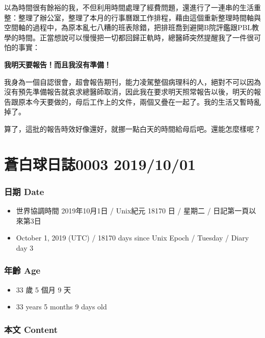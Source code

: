 \documentclass[a5paper, 12pt
]{book}
\providecommand{\tightlist}{%
  \setlength{\itemsep}{0pt}\setlength{\parskip}{0pt}}
\begin{document}
以為時間很有餘裕的我，不但利用時間處理了經費問題，還進行了一連串的生活重整：整理了辦公室，整理了本月的行事曆跟工作排程，藉由這個重新整理時間軸與空間軸的過程中，為原本亂七八糟的班表除錯，把排班喬到避開B院評鑑跟PBL教學的時間。正當想說可以慢慢把一切都回歸正軌時，總醫師突然提醒我了一件很可怕的事實：

\textbf{我明天要報告！而且我沒有準備！}

我身為一個自認很會，超會報告期刊，能力凌駕整個病理科的人，絕對不可以因為沒有預先準備報告就哀求總醫師取消，因此我在要求明天照常報告以後，明天的報告跟原本今天要做的，母后工作上的文件，兩個又疊在一起了。我的生活又暫時亂掉了。

算了，這批的報告時效好像還好，就挪一點白天的時間給母后吧。還能怎麼樣呢？

\hypertarget{ux84bcux767dux7403ux65e5ux8a8c0003-20191001}{%
\section{蒼白球日誌0003
2019/10/01}\label{ux84bcux767dux7403ux65e5ux8a8c0003-20191001}}

\hypertarget{ux65e5ux671f-date-2}{%
\subsubsection{日期 Date}\label{ux65e5ux671f-date-2}}

\begin{itemize}
\tightlist
\item
  世界協調時間 2019年10月1日 / Unix紀元 18170 日 / 星期二 /
  日記第一頁以來第3日
\item
  October 1, 2019 (UTC) / 18170 days since Unix Epoch / Tuesday / Diary
  day 3
\end{itemize}

\hypertarget{ux5e74ux9f61-age-2}{%
\subsubsection{年齡 Age}\label{ux5e74ux9f61-age-2}}

\begin{itemize}
\tightlist
\item
  33 歲 5 個月 9 天
\item
  33 years 5 months 9 days old
\end{itemize}

\hypertarget{ux672cux6587-content-2}{%
\subsubsection{本文 Content}\label{ux672cux6587-content-2}}
\end{document}
